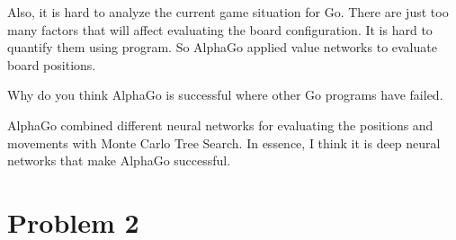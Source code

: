 \documentclass[11pt]{article}
\begin{document}
Also, it is hard to analyze the current game situation for Go. There are just too many factors that will affect evaluating the board configuration. It is hard to quantify them using program. So AlphaGo applied value networks to evaluate board positions. \newline

\noindent
Why do you think AlphaGo is successful where other Go programs have failed.  \newline

AlphaGo combined different neural networks for evaluating the positions and movements with Monte Carlo Tree Search. In essence, I think it is deep neural networks that make AlphaGo successful.\newline



\section*{Problem 2}
\end{document}
